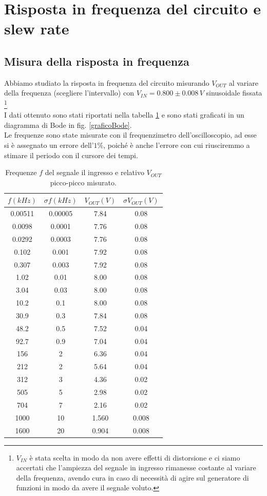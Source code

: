 \documentclass[10pt,a4paper]{article}
\begin{document}
\section{Risposta in frequenza del circuito e slew rate}
\subsection{Misura della risposta in frequenza}

Abbiamo studiato la risposta in frequenza del circuito misurando $V_{OUT}$ al variare della frequenza (scegliere l'intervallo) con $V_{IN}=0.800 \pm 0.008 \, V$  sinusoidale fissata \footnote{$V_{IN}$ è stata scelta in modo da non avere effetti di distorsione e ci siamo accertati che l'ampiezza del segnale in ingresso rimanesse costante al variare della frequenza, avendo cura in caso di necessità di agire sul generatore di funzioni in modo da avere il segnale voluto.} \\
I dati ottenuto sono stati riportati nella tabella \ref{tabellaBode} e sono stati graficati in un diagramma di Bode in fig. \ref{graficoBode}.\\
Le frequenze sono state misurate con il frequenzimetro dell'oscilloscopio, ad esse si è assegnato un errore dell'$1\%$, poiché è anche l'errore con cui riusciremmo a stimare il periodo con il cursore dei tempi.\\

\begin{table}[!htb]\centering
\begin{tabular}{|c|c|c|c|}
\hline
$f (kHz)$ & $\sigma f (kHz) $ & $ V_{OUT} (V)$ & $\sigma V_{OUT} (V)$\\
\hline
0.00511 & 0.00005 & 7.84 & 0.08\\
0.0098 & 0.0001 & 7.76 & 0.08\\
0.0292 & 0.0003 & 7.76 & 0.08\\
0.102 & 0.001 & 7.92 & 0.08\\
0.307 & 0.003 & 7.92 & 0.08\\
1.02 & 0.01 & 8.00 & 0.08\\
3.04 & 0.03 & 8.00 & 0.08\\
10.2 & 0.1 & 8.00 & 0.08\\
30.9 & 0.3 & 7.84 & 0.08\\
48.2 & 0.5 & 7.52 & 0.04\\
92.7 & 0.9 & 7.04 & 0.04\\
156 & 2 & 6.36 & 0.04\\
212 & 2 & 5.64 & 0.04\\
312 & 3 & 4.36 & 0.02\\
505 & 5 & 2.98 & 0.02\\
704 & 7 & 2.16 & 0.02\\
1000 & 10 & 1.560 & 0.008\\
1600 & 20 & 0.904 & 0.008\\
\hline
\end{tabular}
\caption{Frequenze $f$ del segnale il ingresso e relativo $V_{OUT}$ picco-picco misurato.}
\label{tabellaBode}
\end{table}
\end{document}
